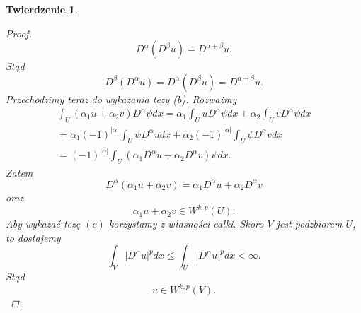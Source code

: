 \documentclass[12pt,a4paper,oneside,titlepage]{article}
\newtheorem{Twierdzenie}{Twierdzenie}
\begin{document}
\begin{Twierdzenie}
\begin{proof}
\begin{equation}
\nonumber
D^{\alpha} \left( D^{\beta} u \right) = D^{\alpha+\beta}u .
\end{equation}
Stąd
\begin{equation}
\nonumber
D^{\beta} \left( D^{\alpha} u \right) = D^{\alpha} \left( D^{\beta} u \right) = D^{\alpha+\beta}u .
\end{equation}
Przechodzimy teraz do wykazania tezy (b). Rozważmy
\begin{equation}
\nonumber
\begin{split}
\int_{U} \left( \alpha_1 u + \alpha_2 v \right) D^{\alpha}\psi dx = \alpha_1 \int_{U} u D^{\alpha} \psi dx + \alpha_2 \int_{U}  v D^{\alpha} \psi dx \\ = \alpha_1 (-1)^{\vert \alpha \vert} \int_{U} \psi D^{\alpha} u  dx + \alpha_2 (-1)^{\vert \alpha \vert} \int_{U} \psi D^{\alpha} v  dx \\ =  (-1)^{\vert \alpha \vert} \int_{U} \left( \alpha_1 D^{\alpha} u + \alpha_2 D^{\alpha} v \right) \psi dx .
\end{split}
\end{equation}
Zatem
\begin{equation}
\nonumber
D^{\alpha}(\alpha_1 u + \alpha_2 v) = \alpha_1 D^{\alpha}u + \alpha_2 D^{\alpha} v 
\end{equation}
oraz
\begin{equation}
\nonumber
\alpha_1 u +\alpha_2 v \in W^{k,p}(U) .
\end{equation}
Aby wykazać tezę $(c)$ korzystamy z własności całki. Skoro $V$ jest podzbiorem $U$, to dostajemy
\begin{equation}
\nonumber
\int_{V} \vert D^{\alpha} u \vert^{p} dx \leq \int_{U} \vert D^{\alpha} u \vert^{p} dx < \infty .
\end{equation}
Stąd
\begin{equation}
\nonumber
u \in W^{k,p}(V) .
\end{equation}
\end{proof}
\end{Twierdzenie}
\newpage
\end{document}
